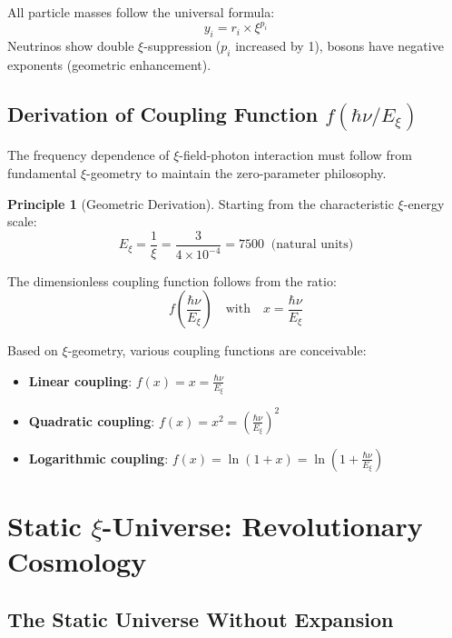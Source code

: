 \documentclass[12pt,a4paper]{article}
\newcommand{\Exi}{E_\xi}
\theoremstyle{definition}
\newtheorem{principle}{Principle}
\begin{document}
	\begin{important}
		All particle masses follow the universal formula:
		\[\boxed{y_i = r_i \times \xi^{p_i}}\]
		Neutrinos show double $\xi$-suppression ($p_i$ increased by 1), bosons have negative exponents (geometric enhancement).
	\end{important}
	
	\subsection{Derivation of Coupling Function $f(\hbar\nu/\Exi)$}
	
	The frequency dependence of $\xi$-field-photon interaction must follow from fundamental $\xi$-geometry to maintain the zero-parameter philosophy.
	
	\begin{principle}[Geometric Derivation]
		Starting from the characteristic $\xi$-energy scale:
		\begin{equation}
			\Exi = \frac{1}{\xi} = \frac{3}{4 \times 10^{-4}} = \SI{7500}{} \text{ (natural units)}
		\end{equation}
		
		The dimensionless coupling function follows from the ratio:
		\begin{equation}
			f\left(\frac{\hbar\nu}{\Exi}\right) \quad \text{with} \quad x = \frac{\hbar\nu}{\Exi}
		\end{equation}
	\end{principle}
	
	Based on $\xi$-geometry, various coupling functions are conceivable:
	\begin{itemize}
		\item \textbf{Linear coupling}: $f(x) = x = \frac{\hbar\nu}{\Exi}$
		\item \textbf{Quadratic coupling}: $f(x) = x^2 = \left(\frac{\hbar\nu}{\Exi}\right)^2$
		\item \textbf{Logarithmic coupling}: $f(x) = \ln(1+x) = \ln\left(1+\frac{\hbar\nu}{\Exi}\right)$
	\end{itemize}
	
	\section{Static $\xi$-Universe: Revolutionary Cosmology}
	
	\subsection{The Static Universe Without Expansion}
	
\end{document}
